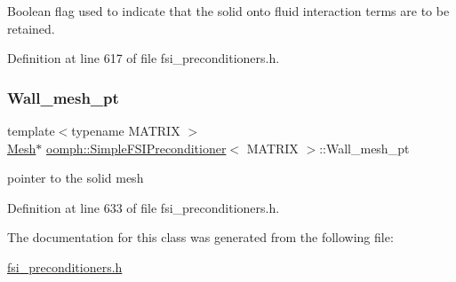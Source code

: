 Boolean flag used to indicate that the solid onto fluid interaction terms are to be retained. 



Definition at line 617 of file fsi\+\_\+preconditioners.\+h.

\mbox{\label{classoomph_1_1SimpleFSIPreconditioner_a3ad28ce867dc02b67f674ff8e159bff8}} 
\subsubsection{\texorpdfstring{Wall\+\_\+mesh\+\_\+pt}{Wall\_mesh\_pt}}
{\footnotesize\ttfamily template$<$typename M\+A\+T\+R\+IX $>$ \\
\hyperlink{classoomph_1_1Mesh}{Mesh}$\ast$ \hyperlink{classoomph_1_1SimpleFSIPreconditioner}{oomph\+::\+Simple\+F\+S\+I\+Preconditioner}$<$ M\+A\+T\+R\+IX $>$\+::Wall\+\_\+mesh\+\_\+pt\hspace{0.3cm}{\ttfamily [private]}}



pointer to the solid mesh 



Definition at line 633 of file fsi\+\_\+preconditioners.\+h.



The documentation for this class was generated from the following file\+:\begin{DoxyCompactItemize}
\item 
\hyperlink{fsi__preconditioners_8h}{fsi\+\_\+preconditioners.\+h}\end{DoxyCompactItemize}
